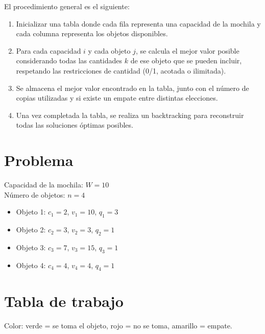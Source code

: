 \documentclass[12pt]{article}
\begin{document}
El procedimiento general es el siguiente:
\begin{enumerate}
  \item Inicializar una tabla donde cada fila representa una capacidad de la mochila y cada columna representa los objetos disponibles.
  \item Para cada capacidad $i$ y cada objeto $j$, se calcula el mejor valor posible considerando todas las cantidades $k$ de ese objeto que se pueden incluir, respetando las restricciones de cantidad (0/1, acotada o ilimitada).
  \item Se almacena el mejor valor encontrado en la tabla, junto con el número de copias utilizadas y si existe un empate entre distintas elecciones.
  \item Una vez completada la tabla, se realiza un backtracking para reconstruir todas las soluciones óptimas posibles.
\end{enumerate}

\bigskip
\section*{Problema}
Capacidad de la mochila: $W = 10$\\
Número de objetos: $n = 4$\\
\begin{itemize}
\item Objeto 1: $c_{1}=2$, $v_{1}=10$, $q_{1}=3$\\
\item Objeto 2: $c_{2}=3$, $v_{2}=3$, $q_{2}=1$\\
\item Objeto 3: $c_{3}=7$, $v_{3}=15$, $q_{3}=1$\\
\item Objeto 4: $c_{4}=4$, $v_{4}=4$, $q_{4}=1$\\
\end{itemize}
\section*{Tabla de trabajo}
Color: {\color{green}verde} = se toma el objeto, {\color{red}rojo} = no se toma, {\color{yellow}amarillo} = empate.\\
\end{document}
